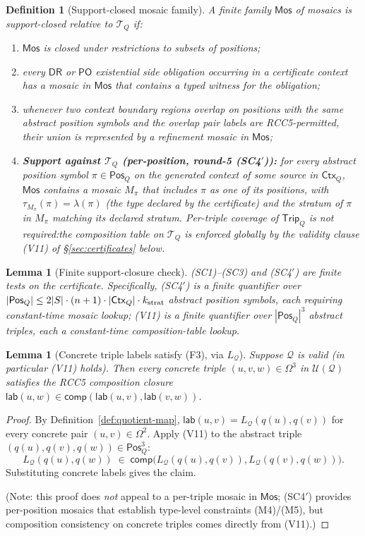 \documentclass[11pt]{article}
\newtheorem{lemma}[theorem]{Lemma}
\newtheorem{definition}[theorem]{Definition}
\newcommand{\DR}{\mathsf{DR}}
\newcommand{\PO}{\mathsf{PO}}
\newcommand{\comp}{\mathsf{comp}}
\newcommand{\Q}{\mathcal Q}
\newcommand{\U}{\mathcal U}
\newcommand{\Mos}{\mathsf{Mos}}
\newcommand{\Ctx}{\mathsf{Ctx}}
\newcommand{\lab}{\mathsf{lab}}
\newcommand{\Pos}{\mathsf{Pos}}
\newcommand{\Trip}{\mathsf{Trip}}
\newcommand{\T}{\mathcal T}
\begin{document}
\begin{definition}[Support-closed mosaic family]\label{def:support-closed}
A finite family $\Mos$ of mosaics is \emph{support-closed} relative
to $\mathcal T_Q$ if:
\begin{enumerate}[label=(SC\arabic*)]
\item $\Mos$ is closed under restrictions to subsets of positions;
\item every $\DR$ or $\PO$ existential side obligation occurring in
a certificate context has a mosaic in $\Mos$ that contains a typed
witness for the obligation;
\item whenever two context boundary regions overlap on positions
with the same abstract position symbols and the overlap pair labels
are RCC5-permitted, their union is represented by a refinement
mosaic in $\Mos$;
\item \textbf{Support against $\T_Q$ (per-position, round-5 (SC4$'$)):}
for every abstract position symbol $\pi\in\Pos_Q$ on the generated
context of some source in $\Ctx_Q$, $\Mos$ contains a mosaic
$M_\pi$ that includes $\pi$ as one of its positions, with
$\tau_{M_\pi}(\pi)=\lambda(\pi)$ (the type declared by the
certificate) and the stratum of $\pi$ in $M_\pi$ matching its
declared stratum.  Per-triple coverage of $\Trip_Q$ is not
required:\@ the composition table on $\T_Q$ is enforced globally by
the validity clause (V11) of \S\ref{sec:certificates} below.
\end{enumerate}
\end{definition}

\begin{lemma}[Finite support-closure check]\label{lem:sc-finite}
(SC1)--(SC3) and (SC4$'$) are finite tests on the certificate.
Specifically, (SC4$'$) is a finite quantifier over $|\Pos_Q|\le
2|S|\cdot(n+1)\cdot|\Ctx_Q|\cdot k_{\rm strat}$ abstract position
symbols, each requiring constant-time mosaic lookup; (V11) is a
finite quantifier over $|\Pos_Q|^3$ abstract triples, each a
constant-time composition-table lookup.
\end{lemma}

\begin{lemma}[Concrete triple labels satisfy (F3), via $L_\Q$]\label{lem:quotient-lift}
Suppose $\Q$ is valid (in particular (V11) holds).  Then every
concrete triple $(u,v,w)\in\Omega^3$ in $\U(\Q)$ satisfies the
RCC5 composition closure
$\lab(u,w)\in\comp(\lab(u,v),\lab(v,w))$.
\end{lemma}

\begin{proof}
By Definition~\ref{def:quotient-map}, $\lab(u,v)=L_\Q(q(u),q(v))$
for every concrete pair $(u,v)\in\Omega^2$.  Apply (V11) to the
abstract triple $(q(u),q(v),q(w))\in\Pos_Q^3$:
\[
  L_\Q(q(u),q(w))\;\in\;\comp\bigl(L_\Q(q(u),q(v)),L_\Q(q(v),q(w))\bigr).
\]
Substituting concrete labels gives the claim.

(Note: this proof does \emph{not} appeal to a per-triple mosaic
in $\Mos$; (SC4$'$) provides per-position mosaics that establish
type-level constraints (M4)/(M5), but composition consistency on
concrete triples comes directly from (V11).)
\end{proof}
\end{document}

